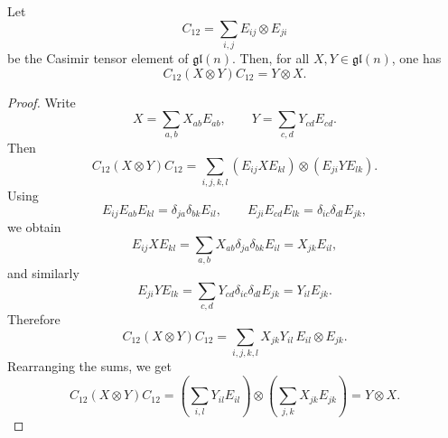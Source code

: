 \begin{lemma}\label{lemma:flipping}
    Let
    \begin{equation}
        C_{12} = \sum_{i,j} E_{ij} \otimes E_{ji}
    \end{equation}
    be the Casimir tensor element of $\mathfrak{gl}(n)$.
    Then, for all $X,Y \in \mathfrak{gl}(n)$, one has
    \begin{equation}
        C_{12}(X \otimes Y)C_{12} = Y \otimes X.
    \end{equation}
\end{lemma}

\begin{proof}
    Write
    \begin{equation}
        X = \sum_{a,b} X_{ab} E_{ab},
        \qquad
        Y = \sum_{c,d} Y_{cd} E_{cd}.
    \end{equation}
    Then
    \begin{equation}
        C_{12}(X \otimes Y)C_{12}
        =
        \sum_{i,j,k,l}
        (E_{ij} X E_{kl}) \otimes (E_{ji} Y E_{lk}).
    \end{equation}
    Using
    \begin{equation}
        E_{ij} E_{ab} E_{kl}
        =
        \delta_{ja}\delta_{bk} E_{il},
        \qquad
        E_{ji} E_{cd} E_{lk}
        =
        \delta_{ic}\delta_{dl} E_{jk},
    \end{equation}
    we obtain
    \begin{equation}
        E_{ij} X E_{kl}
        =
        \sum_{a,b} X_{ab}\delta_{ja}\delta_{bk} E_{il}
        =
        X_{jk} E_{il},
    \end{equation}
    and similarly
    \begin{equation}
        E_{ji} Y E_{lk}
        =
        \sum_{c,d} Y_{cd}\delta_{ic}\delta_{dl} E_{jk}
        =
        Y_{il} E_{jk}.
    \end{equation}
    Therefore
    \begin{equation}
        C_{12}(X \otimes Y)C_{12}
        =
        \sum_{i,j,k,l}
        X_{jk} Y_{il}\,
        E_{il} \otimes E_{jk}.
    \end{equation}
    Rearranging the sums, we get
    \begin{equation}
        C_{12}(X \otimes Y)C_{12}
        =
        \left(\sum_{i,l} Y_{il} E_{il}\right)
        \otimes
        \left(\sum_{j,k} X_{jk} E_{jk}\right)
        =
        Y \otimes X.
    \end{equation}
\end{proof}

